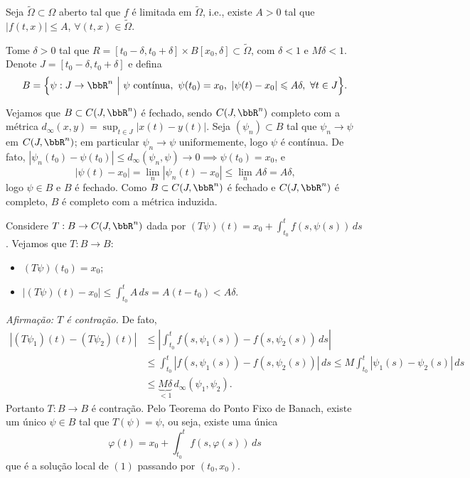 \begin{myproof}
	Seja $\tilde\Omega\subset\Omega$ aberto tal que $f$ é limitada em $\tilde\Omega$, i.e., existe $A>0$
	tal que $|f(t,x)|\leq A$, $\forall(t,x)\in\tilde\Omega$.

	Tome $\delta>0$ tal que $R=[t_0-\delta,t_0+\delta]\times B[x_0,\delta]\subset\tilde\Omega$, com
	$\delta<1$ e $M\delta<1$. Denote $J=[t_0-\delta,t_0+\delta]$ e defina
	$$B=\Big\{\psi:J\to\bbR^n \ \Big|\ \psi \text{ contínua},\ \psi(t_0)=x_0,\ |\psi(t)-x_0|\leq A\delta,\ \forall t\in J\Big\}\text{.}$$

	Vejamos que $B\subset C(J,\bbR^n)$ é fechado, sendo $C(J,\bbR^n)$ completo com a métrica
	$d_\infty(x,y)=\sup_{t\in J}|x(t)-y(t)|$. Seja $(\psi_n)\subset B$ tal que $\psi_n\to\psi$ em
	$C(J,\bbR^n)$; em particular $\psi_n\to\psi$ uniformemente, logo $\psi$ é contínua. De fato,
	$|\psi_n(t_0)-\psi(t_0)|\leq d_\infty(\psi_n,\psi)\to 0 \implies \psi(t_0)=x_0$, e
	$$|\psi(t)-x_0|=\lim_n|\psi_n(t)-x_0|\leq \lim_n A\delta = A\delta\text{,}$$
	logo $\psi\in B$ e $B$ é fechado. Como $B\subset C(J,\bbR^n)$ é fechado e $C(J,\bbR^n)$ é completo, $B$
	é completo com a métrica induzida.

	Considere $T:B\to C(J,\bbR^n)$ dada por $(T\psi)(t)=x_0+\int_{t_0}^{t}f(s,\psi(s))\,ds$. Vejamos que
	$T:B\to B$:
	\begin{itemize}
		\item $(T\psi)(t_0)=x_0$;
		\item $|(T\psi)(t)-x_0|\leq \int_{t_0}^{t}A\,ds=A(t-t_0)<A\delta$.
	\end{itemize}

	\textit{Afirmação: $T$ é contração.} De fato,
	\begin{align*}
		|(T\psi_1)(t)-(T\psi_2)(t)| & \leq \left|\int_{t_0}^{t}f(s,\psi_1(s))-f(s,\psi_2(s))\,ds\right|                     \\
		                            & \leq \int_{t_0}^{t}|f(s,\psi_1(s))-f(s,\psi_2(s))|\,ds \leq M\int_{t_0}^{t}|\psi_1(s)-\psi_2(s)|\,ds \\
		                            & \leq \underbrace{M\delta}_{<1}\, d_\infty(\psi_1,\psi_2)\text{.}
	\end{align*}
	Portanto $T:B\to B$ é contração. Pelo Teorema do Ponto Fixo de Banach, existe um único $\psi\in B$ tal
	que $T(\psi)=\psi$, ou seja, existe uma única
	$$\varphi(t)=x_0+\int_{t_0}^{t}f(s,\varphi(s))\,ds$$
	que é a solução local de $(1)$ passando por $(t_0,x_0)$.
\end{myproof}


